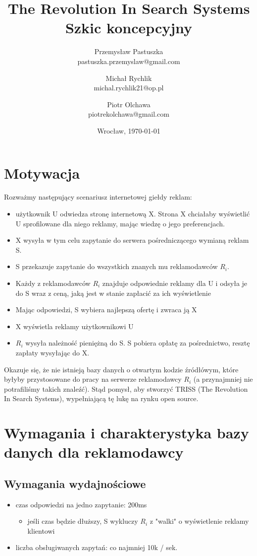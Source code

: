 \documentclass[11pt]{article}
\title{\LARGE \textbf{ The Revolution In Search Systems}\\
                               Szkic koncepcyjny
}
\author{Przemysław Pastuszka\\ pastuszka.przemyslaw@gmail.com \and
        Michał Rychlik\\ michal.rychlik21@op.pl \and
        Piotr Olchawa\\ piotrekolchawa@gmail.com}
\date{Wrocław, \today}
\begin{document}
    \lstset{language=C++}
    \maketitle
    \thispagestyle{empty}
    \tableofcontents
    \newpage

    \section{Motywacja}
        Rozważmy następujący scenariusz internetowej giełdy reklam:
        \begin{itemize}
            \item użytkownik U odwiedza stronę internetową X. Strona X chciałaby wyświetlić U sprofilowane dla niego reklamy, mając wiedzę o jego preferencjach.
            \item X wysyła w tym celu zapytanie do serwera pośredniczącego wymianą reklam S.
            \item S przekazuje zapytanie do wszystkich znanych mu reklamodawców $R_{i}$.
            \item Każdy z reklamodawców $R_{i}$ znajduje odpowiednie reklamy dla U i odsyła je do S wraz z ceną, jaką jest w stanie zapłacić za ich wyświetlenie
            \item Mając odpowiedzi, S wybiera najlepszą ofertę i zwraca ją X
            \item X wyświetla reklamy użytkownikowi U
            \item $R_{i}$ wysyła należność pieniężną do S. S pobiera opłatę za pośrednictwo, resztę zapłaty wysyłając do X.
        \end{itemize}
        Okazuje się, że nie istnieją bazy danych o otwartym kodzie źródłówym, które byłyby przystosowane do pracy na serwerze reklamodawcy $R_{i}$ (a przynajmniej nie potrafiliśmy takich znaleźć). Stąd pomysł, aby stworzyć TRISS (The Revolution In Search Systems), wypełniającą tę lukę na rynku open source.
    \section{Wymagania i charakterystyka bazy danych dla reklamodawcy}
        \subsection{Wymagania wydajnościowe}
        \begin{itemize}
            \item czas odpowiedzi na jedno zapytanie: 200ms
                \begin{itemize}
                    \item jeśli czas będzie dłuższy, S wykluczy $R_{i}$ z "walki" o wyświetlenie reklamy klientowi
                \end{itemize}
            \item liczba obsługiwanych zapytań: co najmniej 10k / sek.
        \end{itemize}
\end{document}
